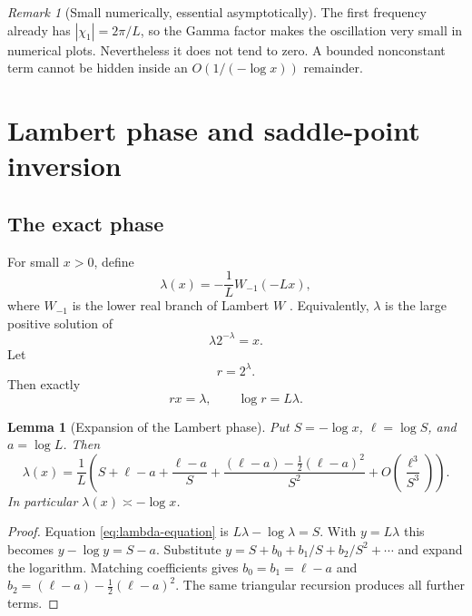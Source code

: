 \documentclass[11pt]{article}
\newtheorem{lemma}[theorem]{Lemma}
\theoremstyle{definition}
\theoremstyle{remark}
\newtheorem{remark}[theorem]{Remark}
\begin{document}
\begin{remark}[Small numerically, essential asymptotically]
The first frequency already has $|\chi_1|=2\pi/L$, so the Gamma factor makes the oscillation very small in numerical plots.  Nevertheless it does not tend to zero.  A bounded nonconstant term cannot be hidden inside an $O(1/(-\log x))$ remainder.
\end{remark}

\section{Lambert phase and saddle-point inversion}\label{sec:asymptotic}
\subsection{The exact phase}
For small $x>0$, define
\begin{equation}\label{eq:lambda-W}
 \lambda(x)=-\frac1L W_{-1}(-Lx),
\end{equation}
where $W_{-1}$ is the lower real branch of Lambert $W$ \cite{Corless}.  Equivalently, $\lambda$ is the large positive solution of
\begin{equation}\label{eq:lambda-equation}
 \lambda2^{-\lambda}=x.
\end{equation}
Let
\begin{equation}\label{eq:r-saddle}
 r=2^\lambda.
\end{equation}
Then exactly
\begin{equation}\label{eq:exact-saddle-identities}
 rx=\lambda,
 \qquad
 \log r=L\lambda.
\end{equation}

\begin{lemma}[Expansion of the Lambert phase]\label{lem:lambda-expansion}
Put $S=-\log x$, $\ell=\log S$, and $a=\log L$.  Then
\begin{equation}\label{eq:lambda-expansion}
 \lambda(x)=\frac1L\left(
 S+\ell-a+\frac{\ell-a}{S}
 +\frac{(\ell-a)-\frac12(\ell-a)^2}{S^2}
 +O\!\left(\frac{\ell^3}{S^3}\right)\right).
\end{equation}
In particular $\lambda(x)\asymp-\log x$.
\end{lemma}
\begin{proof}
Equation \eqref{eq:lambda-equation} is $L\lambda-\log\lambda=S$.  With $y=L\lambda$ this becomes $y-\log y=S-a$.  Substitute
$y=S+b_0+b_1/S+b_2/S^2+\cdots$ and expand the logarithm.  Matching coefficients gives
$b_0=b_1=\ell-a$ and $b_2=(\ell-a)-\frac12(\ell-a)^2$.  The same triangular recursion produces all further terms.
\end{proof}
\end{document}
